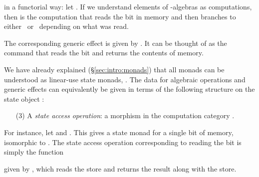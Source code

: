 \documentclass{LMCS}
\newcommand{\hide}[1]{}
\begin{document}
in a functorial way: 
let . 
If we understand elements of -algebras
as computations, then  is the computation that  reads
the bit in memory 
and then branches to either~ or~ depending on what was read.

The corresponding generic effect  
is given by .
It can be thought of as the command that 
reads the bit and returns the contents of memory.

We have already explained (\S\ref{sec:intro:monads})
that all monads can be understood as linear-use state monads,
.
The data for algebraic operations and generic effects
can equivalently be given in terms of the following structure on 
the state object :
\begin{enumerate}
\item[(3)]
A \emph{state access operation}: 
a morphism 
in the computation category .
\end{enumerate}
For instance, let  and .
This gives a state monad for a single bit of memory,
isomorphic to .
The state access operation corresponding to 
reading the bit is simply the function 
 
given by , 
which reads 
the store and returns the result along with the store.
\hide{
For another example,
consider the monad  for printing bits.
We let . We let  be the category
of whose objects are sets  equipped with 
a function ;
morphisms in  are functions that preserve the structure.
The idea is that  is a set of computations
and  is a computation that first prints~ 
and then continues as .
The set of bit-strings  is an object of ,
with . 
The resulting linear-use state monad is the monad for printing bits.

We can investigate this theory in terms of algebraic operations,
generic effects and state access operations.
\begin{itemize}
\item A -algebra is the same thing as an object of ,
and so the algebraic operations are the unary
functions , .
\item The generic effects are 
functions 
,

which describe commands that print 0 and 1 respectively.
\item The state access operations are
homomorphisms ,
which take a bit string -- the history of what has been 
printed so far -- and append 0 or 1.
\end{itemize}
}
\end{document}
